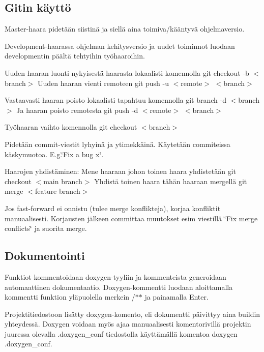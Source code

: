 \subsection*{Gitin käyttö}

Master-\/haara pidetään siistinä ja siellä aina toimiva/kääntyvä ohjelmaversio.

Development-\/haarassa ohjelman kehitysversio ja uudet toiminnot luodaan developmentin päältä tehtyihin työhaaroihin.

Uuden haaran luonti nykyisestä haarasta lokaalisti komennolla {\ttfamily git checkout -\/b $<$branch$>$} Uuden haaran vienti remoteen {\ttfamily git push -\/u $<$remote$>$ $<$branch$>$}

Vastaavasti haaran poisto lokaalisti tapahtuu komennolla {\ttfamily git branch -\/d $<$branch$>$} Ja haaran poisto remotesta {\ttfamily git push -\/d $<$remote$>$ $<$branch$>$}

Työhaaran vaihto komennolla {\ttfamily git checkout $<$branch$>$}

Pidetään commit-\/viestit lyhyinä ja ytimekkäinä. Käytetään commiteissa käskymuotoa. E.\-g.\char`\"{}\-Fix a bug x\char`\"{}.

Haarojen yhdistäminen\-: Mene haaraan johon toinen haara yhdistetään {\ttfamily git checkout $<$main branch$>$} Yhdistä toinen haara tähän haaraan mergellä {\ttfamily git merge $<$feature branch$>$}

Jos fast-\/forward ei onnistu (tulee merge konflikteja), korjaa konfliktit manuaalisesti. Korjausten jälkeen committaa muutokset esim viestillä \char`\"{}\-Fix merge conflicts\char`\"{} ja suorita merge.

\subsection*{Dokumentointi}

Funktiot kommentoidaan doxygen-\/tyyliin ja kommenteista generoidaan automaattinen dokumentaatio. Doxygen-\/kommentti luodaan aloittamalla kommentti funktion yläpuolella merkein {\ttfamily /$\ast$$\ast$} ja painamalla {\ttfamily Enter}.

Projektitiedostoon lisätty doxygen-\/komento, eli dokumentti päivittyy aina buildin yhteydessä. Doxygen voidaan myös ajaa manuaalisesti komentorivillä projektin juuressa olevalla .doxygen\-\_\-conf tiedostolla käyttämällä komentoa {\ttfamily doxygen .doxygen\-\_\-conf}. 